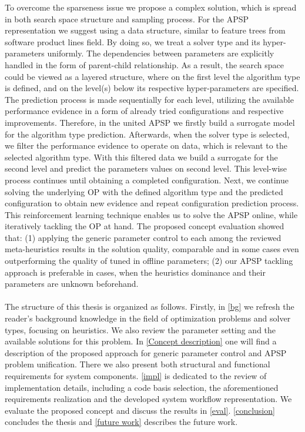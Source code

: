 To overcome the sparseness issue we propose a complex solution, which is spread in both search space structure and sampling process. For the APSP representation we suggest using a data structure, similar to feature trees from software product lines field. By doing so, we treat a solver type and its hyper-parameters uniformly. The dependencies between parameters are explicitly handled in the form of parent-child relationship. As a result, the search space could be viewed as a layered structure, where on the first level the algorithm type is defined, and on the level(s) below its respective hyper-parameters are specified. The prediction process is made sequentially for each level, utilizing the available performance evidence in a form of already tried configurations and respective improvements. Therefore, in the united APSP we firstly build a surrogate model for the algorithm type prediction. Afterwards, when the solver type is selected, we filter the performance evidence to operate on data, which is relevant to the selected algorithm type. With this filtered data we build a surrogate for the second level and predict the parameters values on second level. This level-wise process continues until obtaining a completed configuration. Next, we continue solving the underlying OP with the defined algorithm type and the predicted configuration to obtain new evidence and repeat configuration prediction process. This reinforcement learning technique enables us to solve the APSP online, while iteratively tackling the OP at hand. The proposed concept evaluation showed that: (1) applying the generic parameter control to each among the reviewed meta-heuristics results in the solution quality, comparable and in some cases even outperforming the quality of tuned in offline parameters; (2) our APSP tackling approach is preferable in cases, when the heuristics dominance and their parameters are unknown beforehand.

\paragraph{}
The structure of this thesis is organized as follows. Firstly, in \cref{bg} we refresh the reader's background knowledge in the field of optimization problems and solver types, focusing on heuristics. We also review the parameter setting and the available solutions for this problem. In \cref{Concept description} one will find a description of the proposed approach for generic parameter control and APSP problem unification. There we also present both structural and functional requirements for system components. \cref{impl} is dedicated to the review of implementation details, including a code basis selection, the aforementioned requirements realization and the developed system workflow representation. We evaluate the proposed concept and discuss the results in \cref{eval}. \cref{conclusion} concludes the thesis and \cref{future work} describes the future work.
